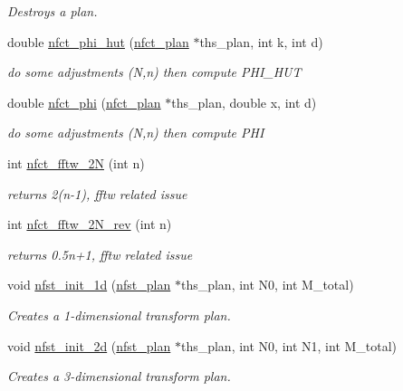 \begin{CompactItemize}
\begin{CompactList}\small\item\em Destroys a plan. \item\end{CompactList}\item 
double \hyperlink{group__nfsct_ga11}{nfct\_\-phi\_\-hut} (\hyperlink{structnfct__plan}{nfct\_\-plan} $\ast$ths\_\-plan, int k, int d)
\begin{CompactList}\small\item\em do some adjustments (N,n) then compute PHI\_\-HUT \item\end{CompactList}\item 
double \hyperlink{group__nfsct_ga12}{nfct\_\-phi} (\hyperlink{structnfct__plan}{nfct\_\-plan} $\ast$ths\_\-plan, double x, int d)
\begin{CompactList}\small\item\em do some adjustments (N,n) then compute PHI \item\end{CompactList}\item 
int \hyperlink{group__nfsct_ga13}{nfct\_\-fftw\_\-2N} (int n)
\begin{CompactList}\small\item\em returns 2(n-1), fftw related issue \item\end{CompactList}\item 
int \hyperlink{group__nfsct_ga14}{nfct\_\-fftw\_\-2N\_\-rev} (int n)
\begin{CompactList}\small\item\em returns 0.5n+1, fftw related issue \item\end{CompactList}\item 
void \hyperlink{group__nfsct_ga15}{nfst\_\-init\_\-1d} (\hyperlink{structnfst__plan}{nfst\_\-plan} $\ast$ths\_\-plan, int N0, int M\_\-total)
\begin{CompactList}\small\item\em Creates a 1-dimensional transform plan. \item\end{CompactList}\item 
void \hyperlink{group__nfsct_ga16}{nfst\_\-init\_\-2d} (\hyperlink{structnfst__plan}{nfst\_\-plan} $\ast$ths\_\-plan, int N0, int N1, int M\_\-total)
\begin{CompactList}\small\item\em Creates a 3-dimensional transform plan. \item\end{CompactList}\item 

\end{CompactItemize}
